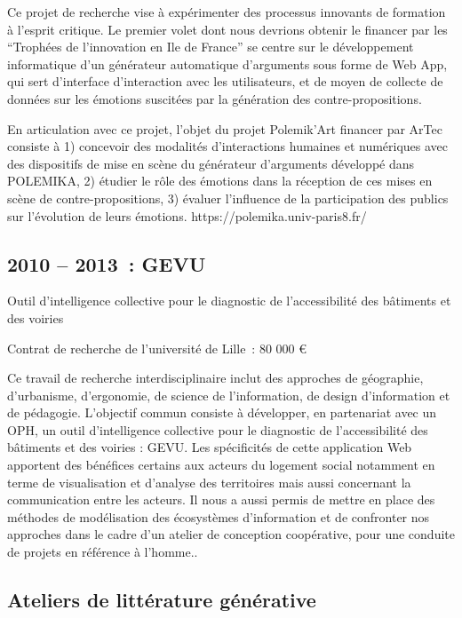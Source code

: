 \documentclass[
  a4paper,
  DIV=11,
  numbers=noendperiod]{scrreprt}
\begin{document}
Ce projet de recherche vise à expérimenter des processus innovants de
formation à l'esprit critique. Le premier volet dont nous devrions
obtenir le financer par les ``Trophées de l'innovation en Ile de
France'' se centre sur le développement informatique d'un générateur
automatique d'arguments sous forme de Web App, qui sert d'interface
d'interaction avec les utilisateurs, et de moyen de collecte de données
sur les émotions suscitées par la génération des contre-propositions.

En articulation avec ce projet, l'objet du projet Polemik'Art financer
par ArTec consiste à 1) concevoir des modalités d'interactions humaines
et numériques avec des dispositifs de mise en scène du générateur
d'arguments développé dans POLEMIKA, 2) étudier le rôle des émotions
dans la réception de ces mises en scène de contre-propositions, 3)
évaluer l'influence de la participation des publics sur l'évolution de
leurs émotions. https://polemika.univ-paris8.fr/

\subsection{2010 -- 2013~: GEVU}\label{sec-projetGEVU}

Outil d'intelligence collective pour le diagnostic de l'accessibilité
des bâtiments et des voiries

Contrat de recherche de l'université de Lille~: 80 000 €~

Ce travail de recherche interdisciplinaire inclut des approches de
géographie, d'urbanisme, d'ergonomie, de science de l'information, de
design d'information et de pédagogie. L'objectif commun consiste à
développer, en partenariat avec un OPH, un outil d'intelligence
collective pour le diagnostic de l'accessibilité des bâtiments et des
voiries : GEVU. Les spécificités de cette application Web apportent des
bénéfices certains aux acteurs du logement social notamment en terme de
visualisation et d'analyse des territoires mais aussi concernant la
communication entre les acteurs. Il nous a aussi permis de mettre en
place des méthodes de modélisation des écosystèmes d'information et de
confronter nos approches dans le cadre d'un atelier de conception
coopérative, pour une conduite de projets en référence à l'homme..

\subsection{Ateliers de littérature
générative}\label{sec-ateliersGenerateur}
\end{document}
